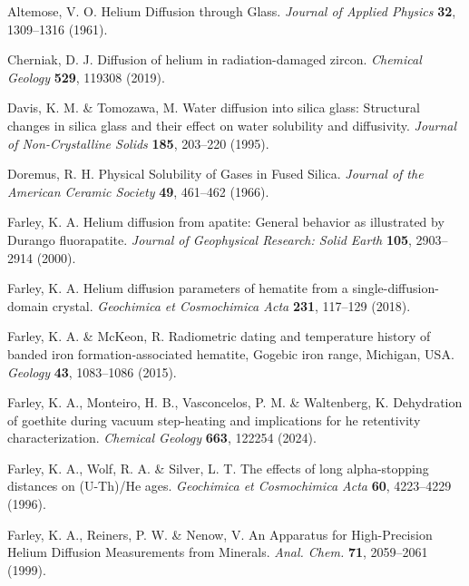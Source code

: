 \documentclass[gchron, manuscript]{copernicus}
\begin{document}
\begin{thebibliography}{}

Altemose, V. O. Helium Diffusion through Glass. \emph{Journal of Applied Physics} \textbf{32}, 1309--1316 (1961).

Cherniak, D. J. Diffusion of helium in radiation-damaged zircon. \emph{Chemical Geology} \textbf{529}, 119308 (2019).

Davis, K. M. \& Tomozawa, M. Water diffusion into silica glass: Structural changes in silica glass and their effect on water solubility and diffusivity. \emph{Journal of Non-Crystalline Solids} \textbf{185}, 203--220 (1995).

Doremus, R. H. Physical Solubility of Gases in Fused Silica. \emph{Journal of the American Ceramic Society} \textbf{49}, 461--462 (1966).

Farley, K. A. Helium diffusion from apatite: General behavior as illustrated by Durango fluorapatite. \emph{Journal of Geophysical Research: Solid Earth} \textbf{105}, 2903--2914 (2000).

Farley, K. A. Helium diffusion parameters of hematite from a single-diffusion-domain crystal. \emph{Geochimica et Cosmochimica Acta} \textbf{231}, 117--129 (2018).

Farley, K. A. \& McKeon, R. Radiometric dating and temperature history of banded iron formation-associated hematite, Gogebic iron range, Michigan, USA. \emph{Geology} \textbf{43}, 1083--1086 (2015).

Farley, K. A., Monteiro, H. B., Vasconcelos, P. M. \& Waltenberg, K. Dehydration of goethite during vacuum step-heating and implications for he retentivity characterization. \emph{Chemical Geology} \textbf{663}, 122254 (2024).

Farley, K. A., Wolf, R. A. \& Silver, L. T. The effects of long alpha-stopping distances on (U-Th)/He ages. \emph{Geochimica et Cosmochimica Acta} \textbf{60}, 4223--4229 (1996).

Farley, K. A., Reiners, P. W. \& Nenow, V. An Apparatus for High-Precision Helium Diffusion Measurements from Minerals. \emph{Anal. Chem.} \textbf{71}, 2059--2061 (1999).


\end{thebibliography}
\end{document}
